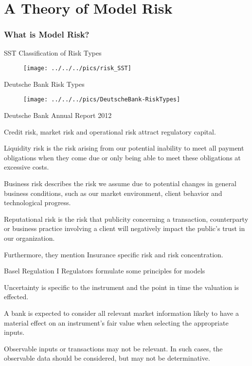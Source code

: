 
\part{A Theory of Model Risk}

\section{What is Model Risk?}

{SST Classification of Risk Types}
\begin{figure}
	\centering
		\texttt{[image: ../../../pics/risk\_SST]}
	\label{fig:Risk_map1}
\end{figure}

{Deutsche Bank Risk Types}
\begin{figure}
	\centering
		\texttt{[image: ../../../pics/DeutscheBank-RiskTypes]}
	\label{fig:Risk_map2}
\end{figure}

{Deutsche Bank Annual Report 2012}
\item<1->
Credit risk, market risk and operational risk attract regulatory capital.
\item<2-> Liquidity risk is the risk arising from our potential inability to meet all payment obligations when they come due or only being able to meet these obligations at excessive costs.
\item<3->Business risk describes the risk we assume due to potential changes in general business conditions, such as our market environment, client behavior and technological progress.
\item<4->Reputational risk is the risk that publicity concerning a transaction, counterparty or business practice involving a client will negatively impact the public's trust in our organization.
\item<5->Furthermore, they mention Insurance specific risk and risk concentration.

{Basel Regulation I}
Regulators formulate some principles for models
\item<1-> Uncertainty is specific to the instrument and the point in time the valuation is effected.
\item<2-> A bank is expected to consider all relevant market information likely to have a material effect on an instrument's fair value when selecting the appropriate inputs.
\item<3->Observable inputs or transactions may not be relevant. In such cases, the observable data should be considered, but   may not be determinative.

